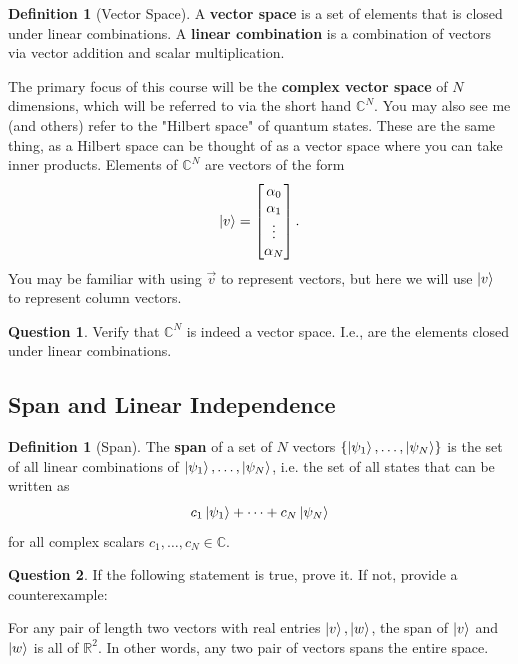 \documentclass[letterpaper, 12pt]{article}
\newcommand{\R}{\mathbb{R}}	%
\newcommand{\C}{\mathbb{C}}	%
\newcommand{\1}{\mathds{1}}	%
\theoremstyle{definition}
\newtheorem{definition}[theorem]{Definition}
\newtheorem{question}{Question}
\begin{document}
\begin{definition}[Vector Space]
    A \textbf{vector space} is a set of elements that is closed under linear combinations. A \textbf{linear combination} is a combination of vectors via vector addition and scalar multiplication. 
\end{definition}

The primary focus of this course will be the \textbf{complex vector space} of $N$ dimensions, which will be referred to via the short hand $\C^N$. You may also see me (and others) refer to the "Hilbert space" of quantum states. These are the same thing, as a Hilbert space can be thought of as a vector space where you can take inner products. Elements of $\C^N$ are vectors of the form 
\begin{equation}
    \ket{v} = \begin{bmatrix}
    \alpha_0 \\ \alpha_1 \\ \vdots \\ \alpha_N
\end{bmatrix}.
\end{equation}
You may be familiar with using $\Vec{v}$ to represent vectors, but here we will use $\ket{v}$ to represent column vectors.

\begin{question}
    Verify that $\C^N$ is indeed a vector space. I.e., are the elements closed under linear combinations.
\end{question}
\vspace{40mm}
\newpage

\subsection{Span and Linear Independence}

\begin{definition}[Span]
    The \textbf{span} of a set of $N$ vectors $\{\ket{\psi_1}, \ldots, \ket{\psi_N}\}$ is the set of all linear combinations of $\ket{\psi_1}, \ldots, \ket{\psi_N}$, i.e. the set of all states that can be written as 
    \begin{equation}
        c_1 \ket{\psi_1} + \cdots + c_N \ket{\psi_N}
    \end{equation}
    for all complex scalars $c_1, \ldots, c_N \in \C$. 
\end{definition}
\vspace{35mm}

\begin{question}
    If the following statement is true, prove it. If not, provide a counterexample:

    For any pair of length two vectors with real entries $\ket{v}, \ket{w}$, the span of $\ket{v}$ and $\ket{w}$ is all of $\R^2$. In other words, any two pair of vectors spans the entire space. 
\end{question}
\vspace{35mm}
\end{document}
